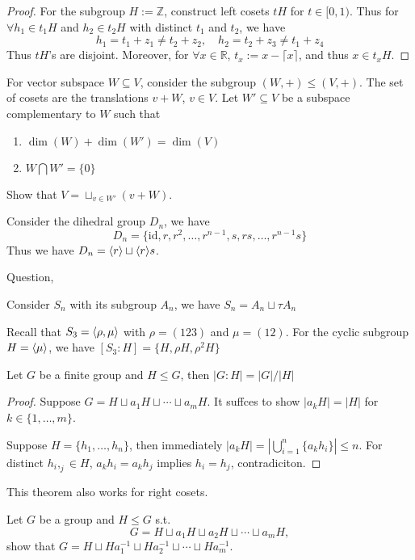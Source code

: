 \begin{proof}
For the subgroup $H:=\mathbb{Z}$, construct left cosets $tH$ for $t\in[0,1)$. Thus for $\forall h_1\in t_1H$ and $h_2\in t_2H$ with distinct $t_1$ and $t_2$, we have
\[
h_1=t_1+z_1\ne t_2+z_2,\quad
h_2=t_2+z_3\ne t_1+z_4
\]
Thus $tH$'s are disjoint. Moreover, for $\forall x\in\mathbb{R}$, $t_x:=x-\lceil{x}\rceil$, and thus $x\in t_xH$.
\end{proof}
\begin{proposition}
For vector subspace $W\subseteq V$, consider the subgroup $(W,+)\le(V,+)$. The set of cosets are the translations $v+W$, $v\in V$. Let $W'\subseteq V$ be a subspace complementary to $W$ such that
\begin{enumerate}
\item
$\dim(W)+\dim(W')=\dim(V)$
\item
$W\bigcap W'=\{0\}$
\end{enumerate}
Show that $V=\sqcup_{v\in W'}(v+W).$
\end{proposition}
\begin{example}
Consider the dihedral group $D_n$, we have
\[
D_n=\{\mbox{id},r,r^2,\dots,r^{n-1},s,rs,\dots,r^{n-1}s\}
\]
Thus we have $D_n=\langle r\rangle\sqcup\langle r\rangle s$.
\end{example}
Question,
\begin{example}
Consider $S_n$ with its subgroup $A_n$, we have $S_n=A_n\sqcup\tau A_n$
\end{example}
\begin{example}
Recall that $S_3=\langle \rho,\mu\rangle$ with $\rho=(123)$ and $\mu=(12)$. For the cyclic subgroup $H=\langle \mu\rangle$, we have $[S_3:H] = \{H,\rho H,\rho^2 H\}$
\end{example}
\begin{theorem}
Let $G$ be a finite group and $H\le G$, then $|G:H|=|G|/|H|$
\end{theorem}
\begin{proof}
Suppose $G=H\sqcup a_1H\sqcup\cdots\sqcup a_mH$. It suffces to show $|a_kH| =|H|$ for $k\in\{1,\dots,m\}$.

Suppose $H=\{h_1,\dots,h_n\}$, then immediately $|a_kH|=|\bigcup_{i=1}^n\{a_kh_i\}|\le n$. For distinct $h_i,_j\in H$, $a_kh_i=a_kh_j$ implies $h_i=h_j$, contradiciton.
\end{proof}
This theorem also works for right cosets.
\begin{proposition}
Let $G$ be a group and $H\le G$ s.t.
\[
G=H\sqcup a_1H\sqcup a_2H\sqcup\cdots\sqcup a_mH,
\]
show that $G=H\sqcup Ha_1^{-1}\sqcup Ha_2^{-1}\sqcup\cdots\sqcup Ha_m^{-1}$.
\end{proposition}
